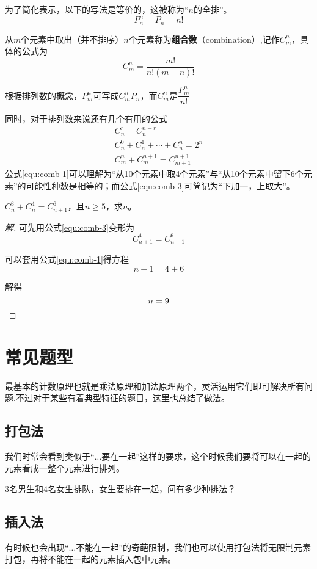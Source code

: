 为了简化表示，以下的写法是等价的，这被称为“$n$的全排”。\[P_n^n=P_n=n!\]

从$m$个元素中取出（并不排序）$n$个元素称为\textbf{组合数}（combination）,记作$C_m^n$，具体的公式为\[C_m^n=\frac{m!}{n!(m-n)!}\]

根据排列数的概念，$P_m^n$可写成$C_m^nP_n$，而$C_m^n$是$\dfrac{P_m^n}{n!}$

同时，对于排列数来说还有几个有用的公式
\begin{gather}
	C_n^r=C_n^{n-r} \label{equ:comb-1} \\
	C_n^0+C_n^1+\cdots+C_n^n=2^n \label{equ:comb-2} \\
	C_m^n+C_m^{n+1}=C_{m+1}^{n+1} \label{equ:comb-3}
\end{gather}
公式\eqref{equ:comb-1}可以理解为“从10个元素中取4个元素”与“从10个元素中留下6个元素”的可能性种数是相等的；而公式\eqref{equ:comb-3}可简记为“下加一，上取大”。

\begin{example}
	$C_n^3+C_n^4=C_{n+1}^6$，且$n\geq5$，求$n$。
\end{example}

\begin{proof}[解]
	可先用公式\eqref{equ:comb-3}变形为\[C_{n+1}^4=C_{n+1}^6\]

	可以套用公式\eqref{equ:comb-1}得方程\[n+1=4+6\]

	解得\[n=9\qedhere\]
\end{proof}

\section{常见题型}
最基本的计数原理也就是乘法原理和加法原理两个，灵活运用它们即可解决所有问题.不过对于某些有着典型特征的题目，这里也总结了做法。

\subsection{打包法}
我们时常会看到类似于“$\dots$要在一起”这样的要求，这个时候我们要将可以在一起的元素看成一整个元素进行排列。

\begin{example}
	$3$名男生和$4$名女生排队，女生要排在一起，问有多少种排法？
\end{example}

\subsection{插入法}
有时候也会出现“$\dots$不能在一起”的奇葩限制，我们也可以使用打包法将无限制元素打包，再将不能在一起的元素插入包中元素。

